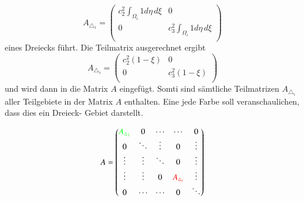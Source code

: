 \begin{equation}
	A_{\triangle_i} = \left( \begin{array}{cc}
	c_2^2 \int_{\Omega_i} 1 d\eta \, d\xi & 0  \\ 
	0 & c_3^2 \int_{\Omega_i} 1 d\eta \, d\xi  \\
	\end{array}\right)
	\label{fem:TeilmatrixA}
\end{equation}
eines Dreiecks führt. Die Teilmatrix ausgerechnet ergibt
\begin{equation}
A_{\triangle_i} = \left( \begin{array}{cc}
	c_2^2 (1-\xi) & 0  \\ 
	0 & c_3^2 (1- \xi) \\
\end{array}\right)
\end{equation}
und wird dann in die Matrix $A$ eingefügt. Somti sind sämtliche Teilmatrizen $A_{\triangle_i}$ aller Teilgebiete in der Matrix $A$ enthalten. Eine jede Farbe soll veranschaulichen, dass dies ein Dreieck- Gebiet darstellt. 

\begin{equation}
 A =	\begin{pmatrix}
	\textcolor{green}{A_{\triangle_1} }& 0 & \cdots & \cdots & 0 \\
	0 & \ddots & \vdots & 0 & \vdots \\
	\vdots & \vdots & \ddots & 0 & \vdots \\
	\vdots & \vdots & 0 & \textcolor{red}{A_{\triangle_i}} & \vdots \\
	0 & \cdots & \cdots & 0 &  \ddots \\
	\end{pmatrix}
\end{equation}

